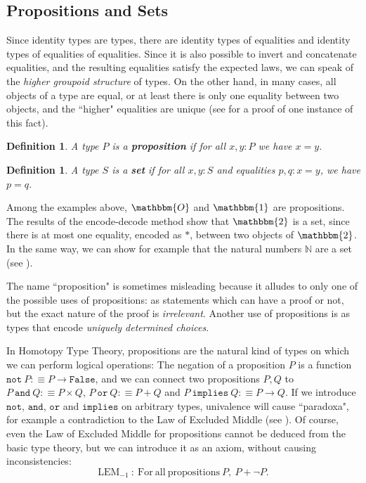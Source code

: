 \documentclass{amsart}
\theoremstyle{plain}
\numberwithin{equation}{section} %
\numberwithin{figure}{section} %
\theoremstyle{plain}
\theoremstyle{plain}
\theoremstyle{plain}
\theoremstyle{plain}
\theoremstyle{plain}
\theoremstyle{plain}
\newtheorem{Def}[thm]{Definition} %
\theoremstyle{remark}
\theoremstyle{remark}
\theoremstyle{remark}
\begin{document}


\subsection{Propositions and Sets} \label{prop-set-ssec}

Since identity types are types, there are identity types of equalities and identity types of equalities of equalities. Since it is also possible to invert and concatenate equalities, and the resulting equalities satisfy the expected laws, we can speak of the \textit{higher groupoid structure} of types. On the other hand, in many cases, all objects of a type are equal, or at least there is only one equality between two objects, and the ``higher" equalities are unique (see \cite[Lem.3.3.4]{HoTTBook} for a proof of one instance of this fact).
\begin{Def}
A type $P$ is a \textbf{proposition} if for all $x, y : P$ we have $x = y$.
\end{Def}  
\begin{Def}
A type $S$ is a \textbf{set} if for all $x, y : S$ and equalities $p, q : x = y$, we have $p = q$.
\end{Def}

Among the examples above, $\mathbbm{O}$ and $\mathbbm{1}$ are propositions. The results of the encode-decode method show that $\mathbbm{2}$ is a set, since there is at most one equality, encoded as $\ast$, between two objects of $\mathbbm{2}$. In the same way, we can show for example that the natural numbers $\mathbb{N}$ are a set (see \cite[Ex.3.1.4]{HoTTBook}).


The name ``proposition" is sometimes misleading because it alludes to only one of the possible uses of propositions: as statements which can have a proof or not, but the exact nature of the proof is \textit{irrelevant}. Another use of propositions is as types that encode \textit{uniquely determined choices}.

In Homotopy Type Theory, propositions are the natural kind of types on which we can perform logical operations: The negation of a proposition $P$ is a function $\mathtt{not\ } P :\equiv P \rightarrow \mathtt{False}$, and we can connect two propositions $P, Q$ to $P \mathtt{\ and\ } Q :\equiv P \times Q$, $P \mathtt{\ or\ } Q :\equiv P + Q$ and $P \mathtt{\ implies\ } Q :\equiv P \rightarrow Q$. If we introduce $\mathtt{not}$, $\mathtt{and}$, $\mathtt{or}$ and $\mathtt{implies}$ on arbitrary types, univalence will cause ``paradoxa", for example a contradiction to the Law of Excluded Middle (see \cite[Cor.3.2.7]{HoTTBook}). Of course, even the Law of Excluded Middle for propositions cannot be deduced from the basic type theory, but we can introduce it as an axiom, without causing inconsistencies:
\[ \mathrm{LEM}_{-1}\ :\ \mathrm{For\ all\ propositions\ } P,\  P + \neg P. \]   
\end{document}
